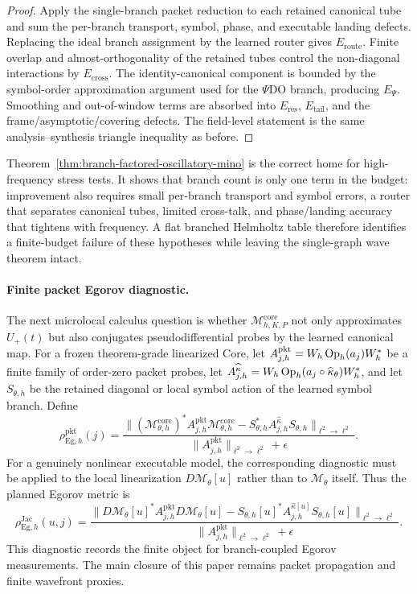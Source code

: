 \begin{proof}
Apply the single-branch packet reduction to each retained canonical tube and sum the per-branch transport, symbol, phase, and executable landing defects.  Replacing the ideal branch assignment by the learned router gives $E_{\mathrm{route}}$.  Finite overlap and almost-orthogonality of the retained tubes control the non-diagonal interactions by $E_{\mathrm{cross}}$.  The identity-canonical component is bounded by the symbol-order approximation argument used for the $\Psi$DO branch, producing $E_{\Psi}$.  Smoothing and out-of-window terms are absorbed into $E_{\mathrm{res}}$, $E_{\mathrm{tail}}$, and the frame/asymptotic/covering defects.  The field-level statement is the same analysis--synthesis triangle inequality as before.
\end{proof}

Theorem~\ref{thm:branch-factored-oscillatory-mino} is the correct home for high-frequency stress tests.  It shows that branch count is only one term in the budget: improvement also requires small per-branch transport and symbol errors, a router that separates canonical tubes, limited cross-talk, and phase/landing accuracy that tightens with frequency.  A flat branched Helmholtz table therefore identifies a finite-budget failure of these hypotheses while leaving the single-graph wave theorem intact.

\paragraph{Finite packet Egorov diagnostic.}
The next microlocal calculus question is whether $\mathcal M_{h,K,P}^{\mathrm{core}}$ not only approximates $U_+(t)$ but also conjugates pseudodifferential probes by the learned canonical map.  For a frozen theorem-grade linearized Core, let $A_{j,h}^{\mathrm{pkt}}=W_h\operatorname{Op}_h(a_j)W_h^\ast$ be a finite family of order-zero packet probes, let $A_{j,h}^{\widehat\kappa}=W_h\operatorname{Op}_h(a_j\circ\widehat\kappa_\theta)W_h^\ast$, and let $S_{\theta,h}$ be the retained diagonal or local symbol action of the learned symbol branch.  Define
\[
\rho_{\mathrm{Eg},h}^{\mathrm{pkt}}(j)
=
\frac{
\bigl\|
(\mathcal M_{\theta,h}^{\mathrm{core}})^\ast
A_{j,h}^{\mathrm{pkt}}
\mathcal M_{\theta,h}^{\mathrm{core}}
-
S_{\theta,h}^\ast A_{j,h}^{\widehat\kappa}S_{\theta,h}
\bigr\|_{\ell^2\to\ell^2}
}{
\|A_{j,h}^{\mathrm{pkt}}\|_{\ell^2\to\ell^2}+\epsilon
}.
\]
For a genuinely nonlinear executable model, the corresponding diagnostic must be applied to the local linearization $D\mathcal M_\theta[u]$ rather than to $\mathcal M_\theta$ itself.  Thus the planned Egorov metric is
\[
\rho_{\mathrm{Eg},h}^{\mathrm{Jac}}(u,j)
=
\frac{
\bigl\|
D\mathcal M_\theta[u]^\ast A_{j,h}^{\mathrm{pkt}}D\mathcal M_\theta[u]
-
S_{\theta,h}[u]^\ast A_{j,h}^{\widehat\kappa[u]}S_{\theta,h}[u]
\bigr\|_{\ell^2\to\ell^2}
}{
\|A_{j,h}^{\mathrm{pkt}}\|_{\ell^2\to\ell^2}+\epsilon
}.
\]
This diagnostic records the finite object for branch-coupled Egorov measurements.  The main closure of this paper remains packet propagation and finite wavefront proxies.

